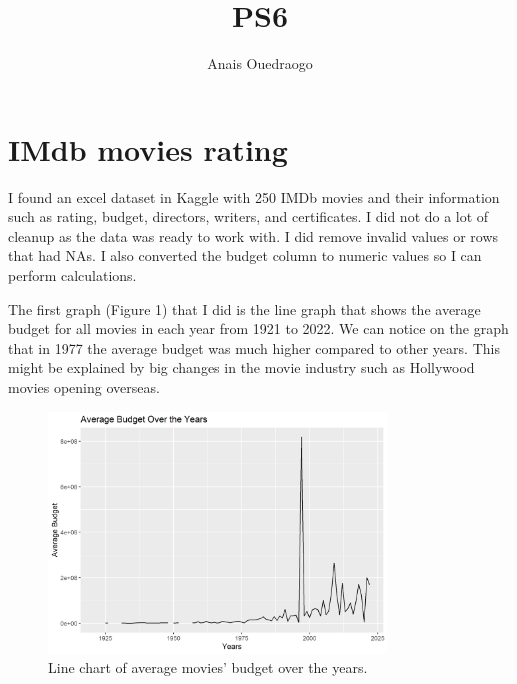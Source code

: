 \documentclass{article}
\title{PS6}
\author{Anais Ouedraogo}
\begin{document}
\maketitle


\section{IMdb movies rating}

I found an excel dataset in Kaggle with 250 IMDb movies and their information such as rating, budget, directors, writers, and certificates. I did not do a lot of cleanup as the data was ready to work with. I did remove invalid values or rows that had NAs. I also converted the budget column to numeric values so I can perform calculations.

The first graph (Figure 1) that I did is the line graph that shows the average budget for all movies in each year from 1921 to 2022. We can notice on the graph that in 1977 the average budget was much higher compared to other years. This might be explained by big changes in the movie industry such as Hollywood movies opening overseas.
\begin{figure}
\centering
\includegraphics[width=0.8\textwidth]{PS6a_Ouedraogo.png}
\caption{\label{fig:graph1}Line chart of average movies' budget over the years.}
\end{figure}
\end{document}
